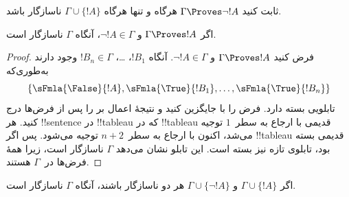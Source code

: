 \documentclass[../../../include/open-logic-section]{subfiles}
\begin{document}
\begin{prob}
ثابت کنید $\Gamma \Proves \lnot !A$ هرگاه و تنها هرگاه
$\Gamma \cup \{!A\}$ ناسازگار باشد.
\end{prob}

\begin{prop}
  اگر $\Gamma \Proves !A$ و $\lnot !A \in \Gamma$، آنگاه $\Gamma$
  ناسازگار است.
\end{prop}

\begin{proof}
  فرض کنید $\Gamma \Proves !A$ و $\lnot !A \in \Gamma$. آنگاه
  $!B_1$، \dots، $!B_n \in \Gamma$ وجود دارند به‌طوری‌که
  \[
  \{\sFmla{\False}{!A}, \sFmla{\True}{!B_1}, \dots, \sFmla{\True}{!B_n}\}
  \]
  تابلویی بسته دارد. فرض  را با
   جایگزین کنید و نتیجهٔ اعمال
  \TRule{\True}{\lnot} بر  را پس از فرض‌ها درج
  کنید. هر !!{sentence} در !!{tableau} که در !!{tableau} قدیمی با ارجاع به
  سطر~$1$ توجیه می‌شد، اکنون با ارجاع به سطر~$n+2$ توجیه می‌شود. پس اگر
  !!{tableau} قدیمی بسته بود، تابلوی تازه نیز بسته است. این تابلو نشان
  می‌دهد $\Gamma$ ناسازگار است، زیرا همهٔ فرض‌ها در~$\Gamma$ هستند.
\end{proof}

\begin{prop}
  اگر $\Gamma \cup \{!A\}$ و $\Gamma \cup \{\lnot !A\}$ هر دو ناسازگار
  باشند، آنگاه $\Gamma$ ناسازگار است.
\end{prop}
\end{document}
